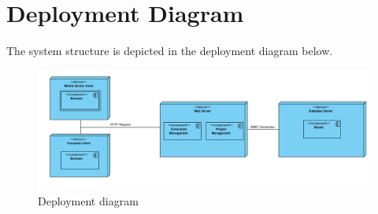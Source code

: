 \documentclass[a4paper, 12pt, oneside]{article}
\begin{document}
\section{Deployment Diagram}
	The system structure is depicted in the deployment diagram below.
\newline
\begin{figure}[h!]
	\includegraphics[width=\linewidth]{images/deployment.png}
	\caption{Deployment diagram}
\end{figure}
\end{document}
